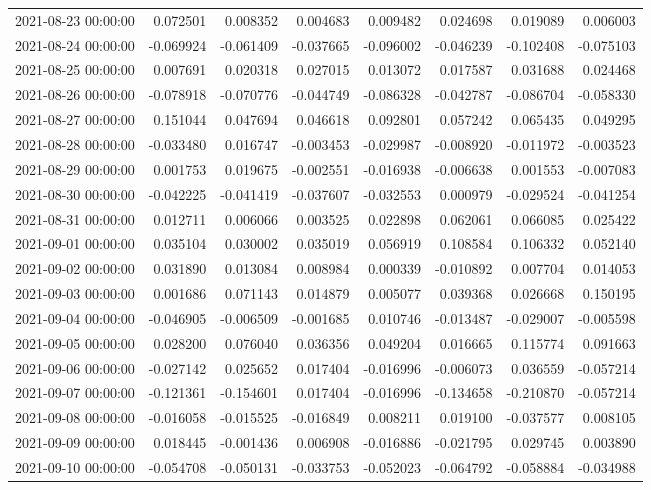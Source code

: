 \begin{tabular}{lrrrrrrr}
2021-08-23 00:00:00 & 0.072501 & 0.008352 & 0.004683 & 0.009482 & 0.024698 & 0.019089 & 0.006003 \\
2021-08-24 00:00:00 & -0.069924 & -0.061409 & -0.037665 & -0.096002 & -0.046239 & -0.102408 & -0.075103 \\
2021-08-25 00:00:00 & 0.007691 & 0.020318 & 0.027015 & 0.013072 & 0.017587 & 0.031688 & 0.024468 \\
2021-08-26 00:00:00 & -0.078918 & -0.070776 & -0.044749 & -0.086328 & -0.042787 & -0.086704 & -0.058330 \\
2021-08-27 00:00:00 & 0.151044 & 0.047694 & 0.046618 & 0.092801 & 0.057242 & 0.065435 & 0.049295 \\
2021-08-28 00:00:00 & -0.033480 & 0.016747 & -0.003453 & -0.029987 & -0.008920 & -0.011972 & -0.003523 \\
2021-08-29 00:00:00 & 0.001753 & 0.019675 & -0.002551 & -0.016938 & -0.006638 & 0.001553 & -0.007083 \\
2021-08-30 00:00:00 & -0.042225 & -0.041419 & -0.037607 & -0.032553 & 0.000979 & -0.029524 & -0.041254 \\
2021-08-31 00:00:00 & 0.012711 & 0.006066 & 0.003525 & 0.022898 & 0.062061 & 0.066085 & 0.025422 \\
2021-09-01 00:00:00 & 0.035104 & 0.030002 & 0.035019 & 0.056919 & 0.108584 & 0.106332 & 0.052140 \\
2021-09-02 00:00:00 & 0.031890 & 0.013084 & 0.008984 & 0.000339 & -0.010892 & 0.007704 & 0.014053 \\
2021-09-03 00:00:00 & 0.001686 & 0.071143 & 0.014879 & 0.005077 & 0.039368 & 0.026668 & 0.150195 \\
2021-09-04 00:00:00 & -0.046905 & -0.006509 & -0.001685 & 0.010746 & -0.013487 & -0.029007 & -0.005598 \\
2021-09-05 00:00:00 & 0.028200 & 0.076040 & 0.036356 & 0.049204 & 0.016665 & 0.115774 & 0.091663 \\
2021-09-06 00:00:00 & -0.027142 & 0.025652 & 0.017404 & -0.016996 & -0.006073 & 0.036559 & -0.057214 \\
2021-09-07 00:00:00 & -0.121361 & -0.154601 & 0.017404 & -0.016996 & -0.134658 & -0.210870 & -0.057214 \\
2021-09-08 00:00:00 & -0.016058 & -0.015525 & -0.016849 & 0.008211 & 0.019100 & -0.037577 & 0.008105 \\
2021-09-09 00:00:00 & 0.018445 & -0.001436 & 0.006908 & -0.016886 & -0.021795 & 0.029745 & 0.003890 \\
2021-09-10 00:00:00 & -0.054708 & -0.050131 & -0.033753 & -0.052023 & -0.064792 & -0.058884 & -0.034988 \\

\end{tabular}
